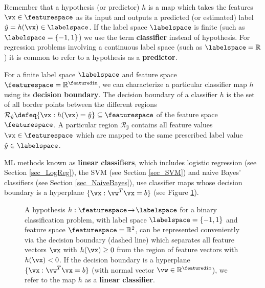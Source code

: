 \documentclass[12pt]{report}
\begin{document}
Remember that a hypothesis (or predictor) $h$ is a map which takes the 
features $\vx \in \featurespace$ as its input and outputs a predicted (or 
estimated) label $\hat{y} = h(\vx) \in \labelspace$. If the label space $\labelspace$ 
is finite (such as $\labelspace=\{-1,1\}$) we use the term {\bf classifier} instead 
of hypothesis. For regression problems involving a continuous label space (such 
as $\labelspace=\mathbb{R}$) it is common to refer to a hypothesis as a {\bf predictor}. 

For a finite label space $\labelspace$ and feature space $\featurespace=\mathbb{R}^{\featuredim}$, 
we can characterize a particular classifier map $h$ using its {\bf decision boundary}. The decision 
boundary of a classifier $h$ is the set of all border points between the different regions 
$\mathcal{R}_{\hat{y}} \defeq \{ \vx: h(\vx) = \hat{y}\} \subseteq \featurespace$ of the feature 
space $\featurespace$. A particular region $\mathcal{R}_{\hat{y}}$ contains all feature 
values $\vx \in \featurespace$ which are mapped to the same prescribed label value $\hat{y} \in \labelspace$. 

ML methods known as {\bf linear classifiers}, which includes logistic regression 
(see Section \ref{sec_LogReg}), the SVM (see Section \ref{sec_SVM}) and naive 
Bayes' classifiers (see Section \ref{sec_NaiveBayes}), use classifier maps whose 
decision boundary is a hyperplane $\{ \vx: \vw^{T} \vx = b \}$ (see Figure \ref{fig_lin_dec_boundary}).
\begin{figure} 
\begin{center}
\end{center}
\caption{A hypothesis $h: \featurespace\!\rightarrow\!\labelspace$ for a binary 
	classification problem, with label space $\labelspace=\{ -1,1\}$ and feature 
	space $\featurespace=\mathbb{R}^{2}$, can be represented conveniently via the 
	decision boundary (dashed line) which separates all feature vectors $\vx$ with 
	$h(\vx) \geq 0 $ from the region of feature vectors with $h(\vx)<0$. If the decision 
	boundary is a hyperplane $\{ \vx: \vw^{T} \vx = b \}$ (with normal vector 
$\vw \in \mathbb{R}^{\featuredim}$), we refer to the map $h$ as a {\bf linear classifier}. }
\label{fig_lin_dec_boundary}
\end{figure}
\end{document}

